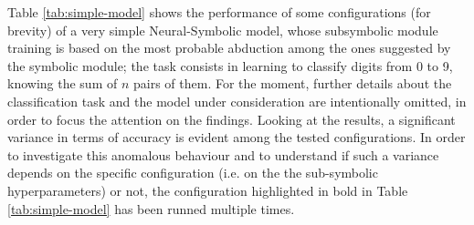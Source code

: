 Table \ref{tab:simple-model} shows the performance of some configurations (for brevity) of a very simple Neural-Symbolic model, whose subsymbolic module training is based on the most probable abduction among the ones suggested by the symbolic module; the task consists in learning to classify digits from 0 to 9, knowing the sum of $n$ pairs of them. For the moment, further details about the classification task and the model under consideration are intentionally omitted, in order to focus the attention on the findings. Looking at the results, a significant variance in terms of accuracy is evident among the tested configurations. In order to investigate this anomalous behaviour and to understand if such a variance depends on the specific configuration (i.e. on the the sub-symbolic hyperparameters) or not, the configuration highlighted in bold in Table \ref{tab:simple-model} has been runned multiple times.

